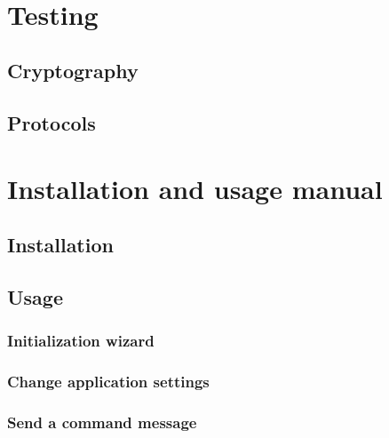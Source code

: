 \documentclass[a4paper,12pt]{article}
\begin{document}
\vspace{0.5cm}
\\
\clearpage

\noindent
\Huge{\section{Testing}}
\subsection{Cryptography}
\subsection{Protocols}
\clearpage

\noindent
\Huge{\section{Installation and usage manual}}
\subsection{Installation}
\subsection{Usage}
\subsubsection{Initialization wizard}
\subsubsection{Change application settings}
\subsubsection{Send a command message}
\clearpage
\end{document}
